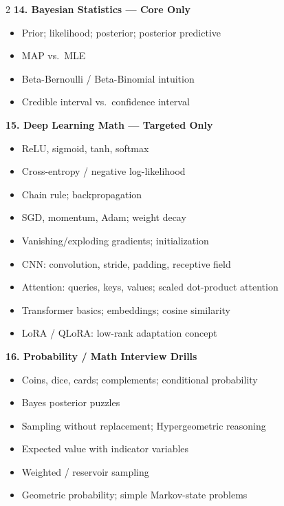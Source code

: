 \documentclass[9pt,a4paper]{article}
\newcommand{\topic}[1]{%
    \vspace{2.2mm}
    {\large\bfseries #1}\par
    \vspace{0.5mm}
}
\begin{document}
\begin{multicols}{2}
\topic{14. Bayesian Statistics --- Core Only}
\begin{itemize}
    \item Prior; likelihood; posterior; posterior predictive
    \item MAP vs.\ MLE
    \item Beta-Bernoulli / Beta-Binomial intuition
    \item Credible interval vs.\ confidence interval
\end{itemize}

\topic{15. Deep Learning Math --- Targeted Only}
\begin{itemize}
    \item ReLU, sigmoid, tanh, softmax
    \item Cross-entropy / negative log-likelihood
    \item Chain rule; backpropagation
    \item SGD, momentum, Adam; weight decay
    \item Vanishing/exploding gradients; initialization
    \item CNN: convolution, stride, padding, receptive field
    \item Attention: queries, keys, values; scaled dot-product attention
    \item Transformer basics; embeddings; cosine similarity
    \item LoRA / QLoRA: low-rank adaptation concept
\end{itemize}

\topic{16. Probability / Math Interview Drills}
\begin{itemize}
    \item Coins, dice, cards; complements; conditional probability
    \item Bayes posterior puzzles
    \item Sampling without replacement; Hypergeometric reasoning
    \item Expected value with indicator variables
    \item Weighted / reservoir sampling
    \item Geometric probability; simple Markov-state problems
\end{itemize}

\end{multicols}
\end{document}
